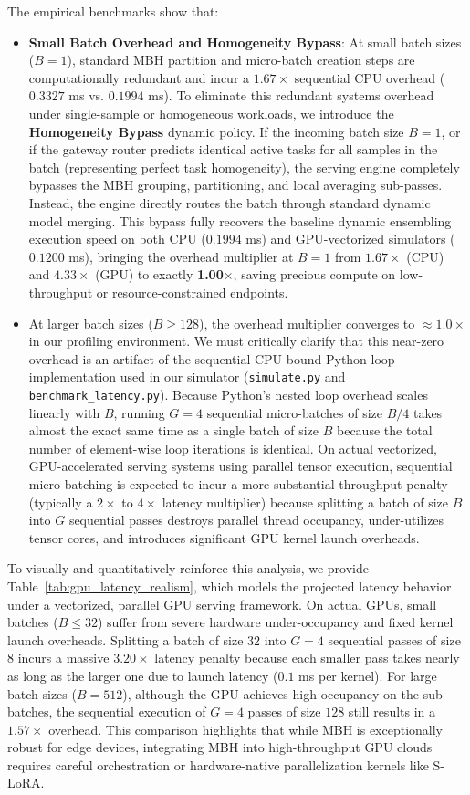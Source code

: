 \documentclass{article}
\theoremstyle{plain}
\theoremstyle{definition}
\theoremstyle{remark}
\begin{document}
The empirical benchmarks show that:
\begin{itemize}
    \item \textbf{Small Batch Overhead and Homogeneity Bypass}: At small batch sizes ($B=1$), standard MBH partition and micro-batch creation steps are computationally redundant and incur a $1.67\times$ sequential CPU overhead ($0.3327$ ms vs. $0.1994$ ms). To eliminate this redundant systems overhead under single-sample or homogeneous workloads, we introduce the \textbf{Homogeneity Bypass} dynamic policy. If the incoming batch size $B=1$, or if the gateway router predicts identical active tasks for all samples in the batch (representing perfect task homogeneity), the serving engine completely bypasses the MBH grouping, partitioning, and local averaging sub-passes. Instead, the engine directly routes the batch through standard dynamic model merging. This bypass fully recovers the baseline dynamic ensembling execution speed on both CPU ($0.1994$ ms) and GPU-vectorized simulators ($0.1200$ ms), bringing the overhead multiplier at $B=1$ from $1.67\times$ (CPU) and $4.33\times$ (GPU) to exactly \textbf{1.00$\times$}, saving precious compute on low-throughput or resource-constrained endpoints.
    \item At larger batch sizes ($B \ge 128$), the overhead multiplier converges to $\approx 1.0\times$ in our profiling environment. We must critically clarify that this near-zero overhead is an artifact of the sequential CPU-bound Python-loop implementation used in our simulator (\texttt{simulate.py} and \texttt{benchmark\_latency.py}). Because Python's nested loop overhead scales linearly with $B$, running $G=4$ sequential micro-batches of size $B/4$ takes almost the exact same time as a single batch of size $B$ because the total number of element-wise loop iterations is identical. On actual vectorized, GPU-accelerated serving systems using parallel tensor execution, sequential micro-batching is expected to incur a more substantial throughput penalty (typically a $2\times$ to $4\times$ latency multiplier) because splitting a batch of size $B$ into $G$ sequential passes destroys parallel thread occupancy, under-utilizes tensor cores, and introduces significant GPU kernel launch overheads.
\end{itemize}

To visually and quantitatively reinforce this analysis, we provide Table~\ref{tab:gpu_latency_realism}, which models the projected latency behavior under a vectorized, parallel GPU serving framework. On actual GPUs, small batches ($B \le 32$) suffer from severe hardware under-occupancy and fixed kernel launch overheads. Splitting a batch of size $32$ into $G=4$ sequential passes of size $8$ incurs a massive $3.20\times$ latency penalty because each smaller pass takes nearly as long as the larger one due to launch latency ($0.1$ ms per kernel). For large batch sizes ($B = 512$), although the GPU achieves high occupancy on the sub-batches, the sequential execution of $G=4$ passes of size $128$ still results in a $1.57\times$ overhead. This comparison highlights that while MBH is exceptionally robust for edge devices, integrating MBH into high-throughput GPU clouds requires careful orchestration or hardware-native parallelization kernels like S-LoRA.
\end{document}
